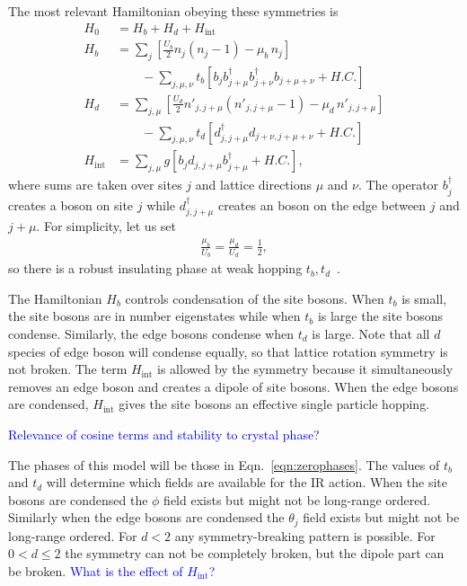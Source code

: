 \documentclass[pra,aps,twocolumn, amsfonts,amsmath,amssymb,nofootinbib,superscriptaddress]{revtex4-2}
\newcommand{\charlie}[1]{\textcolor{Blue}{#1}}
\newcommand{\nn}{\nonumber\\}
\begin{document}
The most relevant Hamiltonian obeying these symmetries is  
\begin{align}
H_0  &= H_b + H_d + H_\text{int}\nn
H_b &= \sum_j \left[ \frac{U_b}{2}  n_j (n_j-1) - \mu_b \, n_j \right] \nn
&\qquad - \sum_{j,\mu,\nu} t_b \left[  b_j b^{\dag}_{j+\mu} b^{\dag}_{j+\nu} b_{j+\mu+\nu} + H.C. \right]\nn
H_d &= \sum_{j,\mu} \left[ \frac{U_d}{2} n'_{j,j+\mu} (n'_{j,j+\mu} - 1) -\mu_d \, n'_{j, j + \mu} \right]\nn
&\qquad  - \sum_{j,\mu,\nu} t_d \left[d^{\dag}_{j, j + \mu} d_{j + \nu, j+\mu + \nu} +H.C.\right]\nn
H_\text{int} &= \sum_{j,\mu} g\left[ b_j d_{j,j+\mu} b^\dag_{j+\mu} + H.C. \right],
\end{align}
where sums are taken over sites $j$ and lattice directions $\mu$ and $\nu$.  The operator $b^\dagger_j$ creates a boson on site $j$ while $d^\dagger_{j,j+\mu}$ creates an boson on the edge between $j$ and $j+\mu$. For simplicity, let us set 
\begin{align}
\frac{\mu_b}{ U_b} = \frac{\mu_d }{ U_d} = \frac{1}{2},
\end{align}
so there is a robust insulating phase at weak hopping $t_b, t_d$~\cite{Fisheretal}. 

The Hamiltonian $H_b$ controls condensation of the site bosons. When $t_b$ is small, the site bosons are in number eigenstates while when $t_b$ is large the site bosons condense. Similarly, the edge bosons condense when $t_d$ is large. Note that all $d$ species of edge boson will condense equally, so that lattice rotation symmetry is not broken. The term $H_\text{int}$ is allowed by the symmetry because it simultaneously removes an edge boson and creates a dipole of site bosons. When the edge bosons are condensed, $H_\text{int}$ gives the site bosons an effective single particle hopping.

\charlie{Relevance of cosine terms and stability to crystal phase?}

The phases of this model will be those in Eqn.~\ref{eqn:zerophases}. The values of $t_b$ and $t_d$ will determine which fields are available for the IR action. When the site bosons are condensed the $\phi$ field exists but might not be long-range ordered. Similarly when the edge bosons are condensed the $\theta_j$ field exists but might not be long-range ordered. For $d<2$ any symmetry-breaking pattern is possible. For $0<d\le 2$ the symmetry can not be completely broken, but the dipole part can be broken. \charlie{What is the effect of $H_\text{int}$?}
\end{document}
